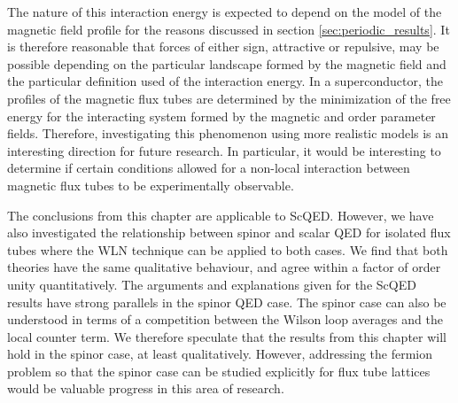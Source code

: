 The nature of this 
interaction energy is expected to depend on the model of the 
magnetic field profile for the reasons discussed in section 
\ref{sec:periodic_results}. It is therefore reasonable that 
forces of either sign, attractive or repulsive, may be possible 
depending on the particular landscape formed by the 
magnetic field and the particular definition used of the interaction 
energy. In a superconductor, the profiles of the magnetic 
flux tubes are determined by the minimization of the free 
energy for the interacting system formed by the magnetic 
and order parameter fields. Therefore, investigating this 
phenomenon using more realistic models is an interesting 
direction for future research. In particular, it would be interesting 
to determine if certain conditions allowed for a non-local interaction 
between magnetic flux tubes to be experimentally observable.

The conclusions from this chapter are applicable to \ac{ScQED}. 
However, we have also investigated the relationship between spinor 
and scalar \ac{QED} for isolated flux tubes where the \ac{WLN} technique 
can be applied to both cases. We find that both theories have the same 
qualitative behaviour, and agree within a factor of order unity quantitatively. The arguments 
and explanations given for the \ac{ScQED} results have strong parallels in the spinor 
\ac{QED} case. The spinor case can also be understood in terms of a competition between 
the Wilson loop averages and the local counter term. We therefore speculate that 
the results from this chapter will hold in the spinor case, at least qualitatively. However, 
addressing the fermion problem so that the spinor case can be studied explicitly for 
flux tube lattices would be valuable progress in this area of research.


